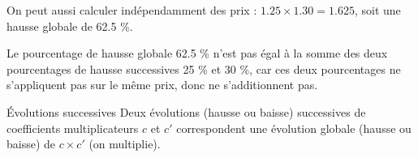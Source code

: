 \documentclass[12pt,a4paper]{article}
\begin{document}
\begin{enumerate}[label=\Alph*.]
\begin{enumerate}[label=\arabic*)]
			On peut aussi calculer indépendamment des prix : $\num{1.25} \times \num{1.30} = \num{1.625}$, soit une hausse globale de \num{62.5} \%.\\
			
			\begin{myrem}
				Le pourcentage de hausse globale \num{62.5} \% n'est pas égal à la somme des deux pourcentages de hausse successives \num{25} \% et \num{30} \%, car ces deux pourcentages ne s'appliquent pas sur le même prix, donc ne s'additionnent pas.
			\end{myrem}
			
			\begin{mybilan2}{\'Evolutions successives}
				Deux évolutions (hausse ou baisse) successives de coefficients multiplicateurs $c$ et $c'$  correspondent  une évolution globale (hausse ou baisse) de $c \times c'$ (on multiplie).
			\end{mybilan2}
		\end{enumerate}
		
\end{enumerate}
\end{document}
